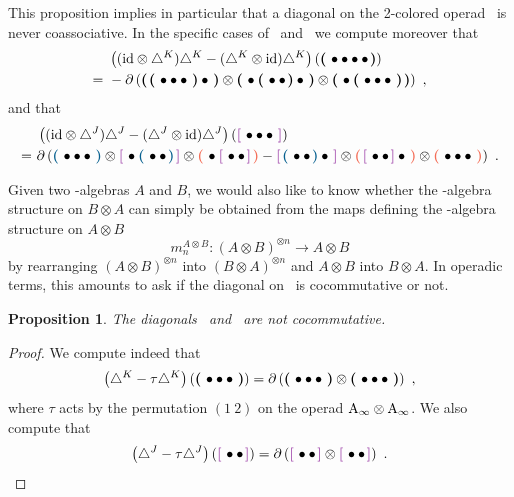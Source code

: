 \documentclass[10pt]{amsart}
\newtheorem{proposition}[definition]{Proposition}
\theoremstyle{remark}
\begin{document}
This proposition implies in particular that a diagonal on the 2-colored operad \Ainfdeux\ is never coassociative.
In the specific cases of \diagainf\ and \diagminf\ we compute moreover that
  \begin{align*}
      &\left( (\mathrm{id} \otimes \triangle^{K} ) \triangle^{K} - (\triangle^{K} \otimes \mathrm{id}) \triangle^{K} \right) \left( \boldsymbol{\left(\right.}  \bullet \bullet \bullet \bullet  \boldsymbol{\left.\right)} \right)  \\
      = \  & - \partial \left( \boldsymbol{\left(\right.}  \boldsymbol{\left(\right.}  \bullet \bullet \bullet  \boldsymbol{\left.\right)} \bullet  \boldsymbol{\left.\right)}  \otimes \boldsymbol{\left(\right.}  \bullet \boldsymbol{\left(\right.}  \bullet \bullet  \boldsymbol{\left.\right)} \bullet  \boldsymbol{\left.\right)} \otimes  \boldsymbol{\left(\right.}  \bullet \boldsymbol{\left(\right.}  \bullet \bullet \bullet  \boldsymbol{\left.\right)}  \boldsymbol{\left.\right)} \right) \ ,
  \end{align*}
and that 
\begin{align*}
      &\left( (\ide \otimes \diagminf ) \diagminf - (\diagminf \otimes \ide) \diagminf \right) \left( \purple{\bullet \bullet \bullet} \right)  \\
      = \ &\partial \left( \blue{\bullet \bullet \bullet} \otimes \purple{ \bullet \blue{\bullet \bullet}} \otimes \red{\bullet \purple{\bullet \bullet}}
    - \purple{\blue{\bullet \bullet} \bullet} \otimes \red{\purple{\bullet \bullet} \bullet} \otimes \red{\bullet \bullet \bullet}
  \right) \ .
\end{align*} 
  
Given two \Ainf -algebras $A$ and $B$, we would also like to know whether the \Ainf -algebra structure on $B \otimes A$ can simply be obtained from the maps defining the \Ainf -algebra structure on $A \otimes B$ \[ m_n^{A \otimes B} : ( A \otimes B)^{\otimes n} \rightarrow A \otimes B \] by rearranging $(A \otimes B)^{\otimes n}$ into $(B \otimes A)^{\otimes n}$ and $A \otimes B$ into $B \otimes A$. 
In operadic terms, this amounts to ask if the diagonal on \Ainf\ is cocommutative or not. 

\begin{proposition} \label{prop:not-cocomm}
The diagonals \diagainf\ and \diagminf\ are not cocommutative.
\end{proposition} 

\begin{proof}
We compute indeed that
\[ \left( \triangle^{K} - \tau \triangle^{K} \right) \left( \boldsymbol{\left(\right.}  \bullet \bullet \bullet  \boldsymbol{\left.\right)} \right) = \partial \left( \boldsymbol{\left(\right.}  \bullet \bullet \bullet  \boldsymbol{\left.\right)} \otimes \boldsymbol{\left(\right.}  \bullet \bullet \bullet  \boldsymbol{\left.\right)} \right) \ , \]
where $\tau$ acts by the permutation $(1 \ 2)$ on the operad $\mathrm{A}_\infty \otimes \mathrm{A}_\infty$.
We also compute that
\[ \left( \diagminf - \tau \diagminf \right) \left( \purple{\bullet \bullet} \right) = \partial \left( \purple{\bullet \bullet} \otimes \purple{\bullet \bullet} \right) \ . \]
\end{proof}
\end{document}
